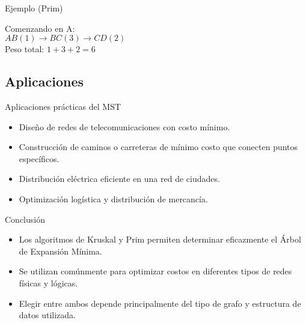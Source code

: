 \documentclass{beamer}
\begin{document}
\begin{frame}{Ejemplo (Prim)}

\centering
{}

\vspace{0.3cm}

{\small Comenzando en A:\\
$AB(1)\rightarrow BC(3)\rightarrow CD(2)$\\
Peso total: $1+3+2=6$}

\end{frame}

\subsection{Aplicaciones}

\begin{frame}{Aplicaciones prácticas del MST}

\begin{itemize}
    \item Diseño de redes de telecomunicaciones con costo mínimo.
    \item Construcción de caminos o carreteras de mínimo costo que conecten puntos específicos.
    \item Distribución eléctrica eficiente en una red de ciudades.
    \item Optimización logística y distribución de mercancía.
\end{itemize}

\end{frame}

\begin{frame}{Conclusión}

\begin{itemize}
    \item Los algoritmos de Kruskal y Prim permiten determinar eficazmente el Árbol de Expansión Mínima.
    \item Se utilizan comúnmente para optimizar costos en diferentes tipos de redes físicas y lógicas.
    \item Elegir entre ambos depende principalmente del tipo de grafo y estructura de datos utilizada.
\end{itemize}

\end{frame}
\end{document}
